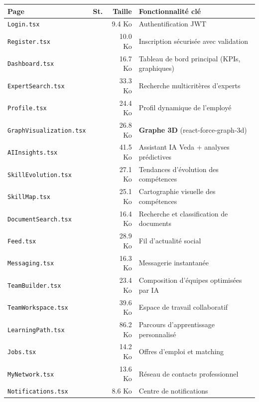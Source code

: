\documentclass[12pt,a4paper]{article}
\newcommand{\cmark}{\textcolor{vert}{\ding{51}}}
\begin{document}
\begin{center}
\renewcommand{\arraystretch}{1.2}
\begin{tabular}{|l|c|r|l|}
\hline
\rowcolor{bleu!15}
\textbf{Page} & \textbf{St.} & \textbf{Taille} & \textbf{Fonctionnalité clé} \\
\hline
\texttt{Login.tsx} & \cmark & 9.4 Ko & Authentification JWT \\
\hline
\texttt{Register.tsx} & \cmark & 10.0 Ko & Inscription sécurisée avec validation \\
\hline
\texttt{Dashboard.tsx} & \cmark & 16.7 Ko & Tableau de bord principal (KPIs, graphiques) \\
\hline
\texttt{ExpertSearch.tsx} & \cmark & 33.3 Ko & Recherche multicritères d'experts \\
\hline
\texttt{Profile.tsx} & \cmark & 24.4 Ko & Profil dynamique de l'employé \\
\hline
\texttt{GraphVisualization.tsx} & \cmark & 26.8 Ko & \textbf{Graphe 3D} (react-force-graph-3d) \\
\hline
\texttt{AIInsights.tsx} & \cmark & 41.5 Ko & Assistant IA Veda + analyses prédictives \\
\hline
\texttt{SkillEvolution.tsx} & \cmark & 27.1 Ko & Tendances d'évolution des compétences \\
\hline
\texttt{SkillMap.tsx} & \cmark & 25.1 Ko & Cartographie visuelle des compétences \\
\hline
\texttt{DocumentSearch.tsx} & \cmark & 16.4 Ko & Recherche et classification de documents \\
\hline
\texttt{Feed.tsx} & \cmark & 28.9 Ko & Fil d'actualité social \\
\hline
\texttt{Messaging.tsx} & \cmark & 16.3 Ko & Messagerie instantanée \\
\hline
\texttt{TeamBuilder.tsx} & \cmark & 23.4 Ko & Composition d'équipes optimisées par IA \\
\hline
\texttt{TeamWorkspace.tsx} & \cmark & 39.6 Ko & Espace de travail collaboratif \\
\hline
\texttt{LearningPath.tsx} & \cmark & 86.2 Ko & Parcours d'apprentissage personnalisé \\
\hline
\texttt{Jobs.tsx} & \cmark & 14.2 Ko & Offres d'emploi et matching \\
\hline
\texttt{MyNetwork.tsx} & \cmark & 13.6 Ko & Réseau de contacts professionnel \\
\hline
\texttt{Notifications.tsx} & \cmark & 8.6 Ko & Centre de notifications \\
\hline
\end{tabular}
\end{center}
\end{document}
